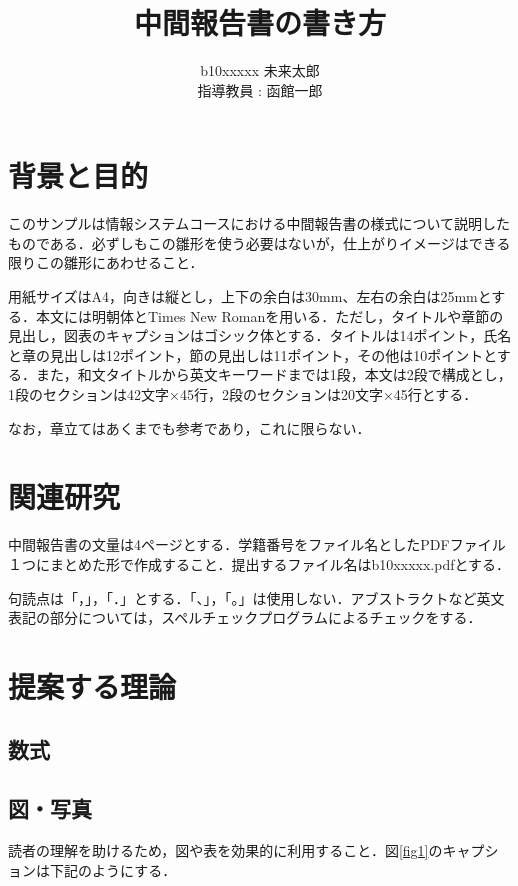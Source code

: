 \documentclass[11pt, a4paper]{jarticle}
\author{%
b10xxxxx 未来太郎\\指導教員 : 函館一郎
}
\title{中間報告書の書き方}
\begin{document}
\maketitle

\section{背景と目的}

このサンプルは情報システムコースにおける中間報告書の様式について説明したものである．必ずしもこの雛形を使う必要はないが，仕上がりイメージはできる限りこの雛形にあわせること．

用紙サイズはA4，向きは縦とし，上下の余白は30mm、左右の余白は25mmとする．本文には明朝体とTimes New Romanを用いる．ただし，タイトルや章節の見出し，図表のキャプションはゴシック体とする．タイトルは14ポイント，氏名と章の見出しは12ポイント，節の見出しは11ポイント，その他は10ポイントとする．また，和文タイトルから英文キーワードまでは1段，本文は2段で構成とし，1段のセクションは42文字×45行，2段のセクションは20文字×45行とする．

なお，章立てはあくまでも参考であり，これに限らない．

\section{関連研究}

中間報告書の文量は4ページとする．学籍番号をファイル名としたPDFファイル１つにまとめた形で作成すること．提出するファイル名はb10xxxxx.pdfとする．

句読点は「，」，「．」とする．「、」，「。」は使用しない．アブストラクトなど英文表記の部分については，スペルチェックプログラムによるチェックをする．

\section{提案する理論}

\subsection{数式}



\subsection{図・写真}

読者の理解を助けるため，図や表を効果的に利用すること．図\ref{fig1}のキャプションは下記のようにする．
\end{document}
